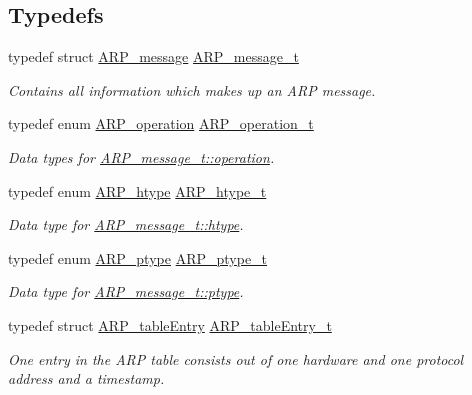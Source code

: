 \subsection*{Typedefs}
\begin{DoxyCompactItemize}
\item 
typedef struct \mbox{\hyperlink{struct_a_r_p__message}{A\+R\+P\+\_\+message}} \mbox{\hyperlink{group__arp_ga1708785291f10e8cc257efe2b769ba4c}{A\+R\+P\+\_\+message\+\_\+t}}
\begin{DoxyCompactList}\small\item\em Contains all information which makes up an A\+RP message. \end{DoxyCompactList}\item 
typedef enum \mbox{\hyperlink{group__arp_ga403f6527e9ff615efd0c8ed05790fde3}{A\+R\+P\+\_\+operation}} \mbox{\hyperlink{group__arp_ga3aca071e2781c5efead1609fcbb58ad3}{A\+R\+P\+\_\+operation\+\_\+t}}
\begin{DoxyCompactList}\small\item\em Data types for \mbox{\hyperlink{struct_a_r_p__message_ad21c763fa2f80cb8649108b759113b54}{A\+R\+P\+\_\+message\+\_\+t\+::operation}}. \end{DoxyCompactList}\item 
typedef enum \mbox{\hyperlink{group__arp_gad603463074b00d9c86a9cdb23083f37d}{A\+R\+P\+\_\+htype}} \mbox{\hyperlink{group__arp_gafa7086c12e44433aa82abcac54e74242}{A\+R\+P\+\_\+htype\+\_\+t}}
\begin{DoxyCompactList}\small\item\em Data type for \mbox{\hyperlink{struct_a_r_p__message_aaf87c38602b614bc7896cf7a5a90d372}{A\+R\+P\+\_\+message\+\_\+t\+::htype}}. \end{DoxyCompactList}\item 
typedef enum \mbox{\hyperlink{group__arp_gaeae5f5d6313cd707dd97fa24dbab569c}{A\+R\+P\+\_\+ptype}} \mbox{\hyperlink{group__arp_gab3358c917e9f326ba4187aed82248923}{A\+R\+P\+\_\+ptype\+\_\+t}}
\begin{DoxyCompactList}\small\item\em Data type for \mbox{\hyperlink{struct_a_r_p__message_ab4891e9b77eb26f33d21cfde982564cb}{A\+R\+P\+\_\+message\+\_\+t\+::ptype}}. \end{DoxyCompactList}\item 
typedef struct \mbox{\hyperlink{struct_a_r_p__table_entry}{A\+R\+P\+\_\+table\+Entry}} \mbox{\hyperlink{group__arp_gab5d4ef9cd020c5de772f55549aa70716}{A\+R\+P\+\_\+table\+Entry\+\_\+t}}
\begin{DoxyCompactList}\small\item\em One entry in the A\+RP table consists out of one hardware and one protocol address and a timestamp. \end{DoxyCompactList}\end{DoxyCompactItemize}

